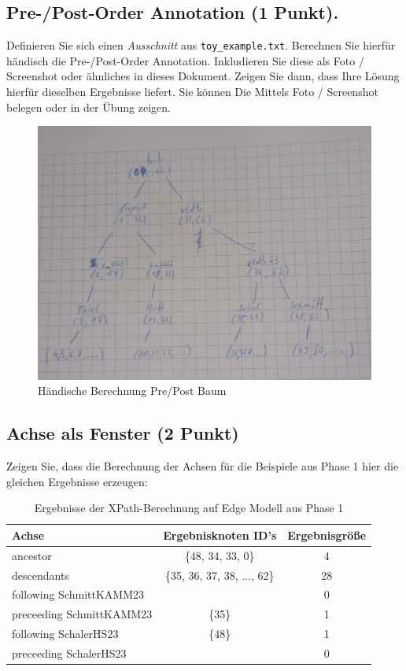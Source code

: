 \documentclass[11pt]{scrartcl}
\begin{document}
\subsection*{Pre-/Post-Order Annotation (1 Punkt).}
Definieren Sie sich einen \textit{Ausschnitt} aus \texttt{toy\_example.txt}.
Berechnen Sie hierfür händisch die Pre-/Post-Order Annotation.
Inkludieren Sie diese als Foto / Screenshot oder ähnliches in dieses Dokument.
Zeigen Sie dann, dass Ihre Lösung hierfür dieselben Ergebnisse liefert.
Sie können Die Mittels Foto / Screenshot belegen oder in der Übung zeigen.

\begin{figure}[H]
	\includegraphics[width=\linewidth]{PrePostBaum.png}
	\caption{Händische Berechnung Pre/Post Baum}\label{fig:node}
\end{figure}

\newpage

\subsection*{Achse als Fenster (2 Punkt)}
Zeigen Sie, dass die Berechnung der Achsen für die Beispiele aus Phase 1 hier die gleichen Ergebnisse erzeugen:

\begin{table}[h]
	\centering
		\begin{center}
			\begin{tabular}{ l | c c }
				\toprule
				Achse & Ergebnisknoten ID's & Ergebnisgröße\\
				\midrule
				ancestor & \{48, 34, 33, 0\} & 4 \\
				descendants & \{35, 36, 37, 38, ..., 62\} & 28 \\
				following SchmittKAMM23 & \emptyset & 0 \\
				preceeding SchmittKAMM23 & \{35\} & 1 \\
				following SchalerHS23 & \{48\} & 1 \\
				preceeding SchalerHS23 & \emptyset & 0 \\
				\bottomrule
			\end{tabular}
			\end{center}
	\caption{Ergebnisse der XPath-Berechnung auf Edge Modell aus Phase 1}
	\label{tab:ErgebnisseDerXPathBerechnug}
\end{table}
\end{document}
